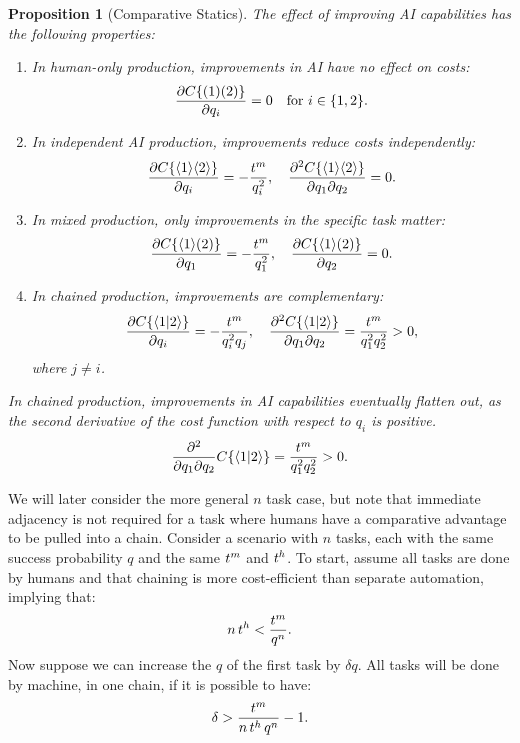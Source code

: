 \documentclass{article}
\theoremstyle{plain}
\theoremstyle{plain}
\newtheorem{proposition}[theorem]{Proposition}
\begin{document}
\begin{proposition}[Comparative Statics] \label{prop:comparative_statics}
  The effect of improving AI capabilities has the following properties:
  \begin{enumerate}
  \item In human-only production, improvements in AI have no effect on costs:
  \[
  \frac{\partial C\{ ( 1 )( 2 ) \}}{\partial q_i} = 0 \quad \text{for } i \in \{1,2\}.
  \]
  \item In independent AI production, improvements reduce costs independently:
  \[
  \frac{\partial C\{ \langle 1 \rangle\langle 2 \rangle \}}{\partial q_i} = -\frac{t^{m}_{}}{q_i^2}, \quad \frac{\partial^2 C\{ \langle 1 \rangle\langle 2 \rangle \}}{\partial q_1 \partial q_2} = 0.
  \]
  \item In mixed production, only improvements in the specific task matter:
  \[
  \frac{\partial C\{ \langle 1 \rangle( 2 ) \}}{\partial q_1} = -\frac{t^{m}_{}}{q_1^2}, \quad \frac{\partial C\{ \langle 1 \rangle( 2 ) \}}{\partial q_2} = 0.
  \]
  \item In chained production, improvements are complementary:
  \[
  \frac{\partial C\{ \langle 1|2 \rangle \}}{\partial q_i} = -\frac{t^{m}_{}}{q_i^2 q_j}, \quad \frac{\partial^2 C\{ \langle 1|2 \rangle \}}{\partial q_1 \partial q_2} = \frac{t^{m}_{}}{q_1^2 q_2^2} > 0,
  \]
  where \(j \neq i\).
  \end{enumerate}

  In chained production, improvements in AI capabilities eventually flatten out, as the second derivative of the cost function with respect to \(q_i\) is positive.
  \begin{equation}
      \frac{\partial^2}{\partial q_1 \partial q_2} C\{ \langle 1|2 \rangle \} = \frac{t^{m}_{}}{q_1^2 q_2^2} > 0.
  \end{equation}

\end{proposition}
 
We will later consider the more general \(n\) task case, but note that immediate adjacency is not required for a task where humans have a comparative advantage to be pulled into a chain.
Consider a scenario with \(n\) tasks, each with the same success probability \(q\) and the same \(t^{m}_{}\) and \(t^{h}_{}\).
To start, assume all tasks are done by humans and that chaining is more cost-efficient than separate automation, implying that:
\[
n\, t^{h}_{} < \frac{t^{m}_{}}{q^n}.
\]
Now suppose we can increase the \(q\) of the first task by \(\delta q\). 
All tasks will be done by machine, in one chain, if it is possible to have:
\begin{align}
  \delta > \frac{t^{m}_{}}{n\, t^{h}_{}{}\, q^{n}} - 1.
\end{align} 
\end{document}
